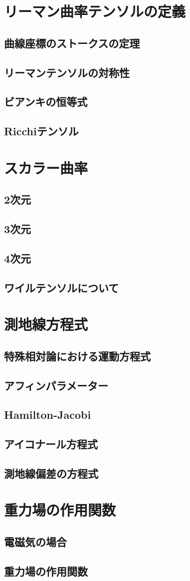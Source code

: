 \documentclass{jsarticle}
\begin{document}
\section{リーマン曲率テンソルの定義}
\subsection{曲線座標のストークスの定理}
\subsection{リーマンテンソルの対称性}
\subsection{ビアンキの恒等式}
\subsection{Ricchiテンソル}
\section{スカラー曲率}
\subsection{2次元}
\subsection{3次元}
\subsection{4次元}
\subsection{ワイルテンソルについて}
\section{測地線方程式}
\subsection{特殊相対論における運動方程式}
\subsection{アフィンパラメーター}
\subsection{Hamilton-Jacobi}
\subsection{アイコナール方程式}
\subsection{測地線偏差の方程式}
\section{重力場の作用関数}
\subsection{電磁気の場合}
\subsection{重力場の作用関数}
\end{document}
